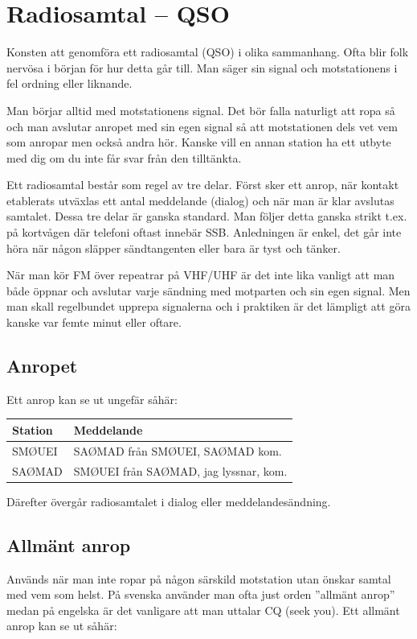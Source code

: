 \section{Radiosamtal -- QSO}

Konsten att genomföra ett radiosamtal (QSO) i olika sammanhang. Ofta blir folk
nervösa i början för hur detta går till. Man säger sin signal och motstationens
i fel ordning eller liknande.

Man börjar alltid med motstationens signal. Det bör falla naturligt att ropa så
och man avslutar anropet med sin egen signal så att motstationen dels vet vem
som anropar men också andra hör. Kanske vill en annan station ha ett utbyte med
dig om du inte får svar från den tilltänkta.

Ett radiosamtal består som regel av tre delar. Först sker ett anrop, när kontakt
etablerats utväxlas ett antal meddelande (dialog) och när man är klar avslutas
samtalet. Dessa tre delar är ganska standard. Man följer detta ganska strikt
t.ex. på kortvågen där telefoni oftast innebär SSB. Anledningen är enkel, det
går inte höra när någon släpper sändtangenten eller bara är tyst och tänker.

När man kör FM över repeatrar på VHF/UHF är det inte lika vanligt att man både
öppnar och avslutar varje sändning med motparten och sin egen signal. Men man
skall regelbundet upprepa signalerna och i praktiken är det lämpligt att göra
kanske var femte minut eller oftare.

\subsection{Anropet}

Ett anrop kan se ut ungefär såhär:

\begin{tabular}{ll}
	Station & Meddelande                            \\ \hline
	SMØUEI  & SAØMAD från SMØUEI, SAØMAD kom.       \\
	SAØMAD  & SMØUEI från SAØMAD, jag lyssnar, kom.
\end{tabular}

Därefter övergår radiosamtalet i dialog eller meddelandesändning.

\subsection{Allmänt anrop}

Används när man inte ropar på någon särskild motstation utan önskar samtal med
vem som helst. På svenska använder man ofta just orden ''allmänt anrop'' medan
på engelska är det vanligare att man uttalar CQ (seek you). Ett allmänt anrop
kan se ut såhär:

